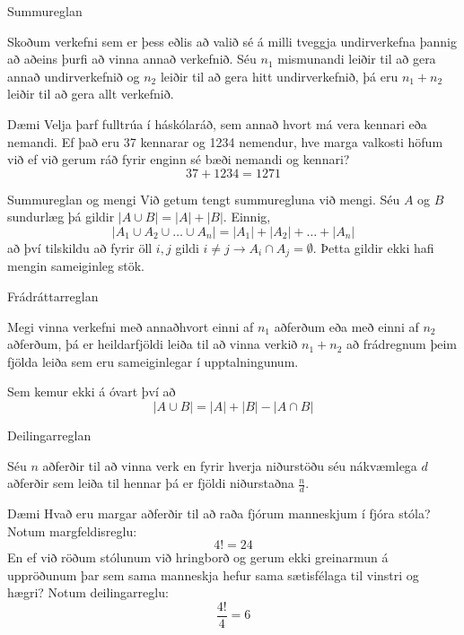 \documentclass{beamer}
\begin{document}
\begin{frame}{Summureglan}
\begin{tcolorbox}[title=Summureglan]
Skoðum verkefni sem er þess eðlis að valið sé á milli tveggja undirverkefna þannig að aðeins þurfi að vinna annað verkefnið. Séu $n_1$ mismunandi leiðir til að gera annað undirverkefnið og $n_2$ leiðir til að gera hitt undirverkefnið, þá eru $n_1 + n_2$ leiðir til að gera allt verkefnið.
\end{tcolorbox}
\end{frame}

\begin{frame}{Dæmi}
Velja þarf fulltrúa í háskólaráð, sem annað hvort má vera kennari eða nemandi. Ef það eru 37 kennarar og 1234 nemendur, hve marga valkosti höfum við ef við gerum ráð fyrir enginn sé bæði nemandi og kennari?
\pause
\[
 37+1234 = 1271
\]
\end{frame}

\begin{frame}{Summureglan og mengi}
Við getum tengt summuregluna við mengi. Séu $A$ og $B$ sundurlæg þá gildir $|A \cup B| = |A| + |B|$. Einnig,
\[
 |A_1 \cup A_2 \cup \ldots \cup A_n| = |A_1| + |A_2| + \ldots + |A_n|
\]
að því tilskildu að fyrir öll $i,j$ gildi $i \neq j \to A_i \cap A_j = \emptyset$. Þetta gildir ekki hafi mengin sameiginleg stök.
\end{frame}

\begin{frame}{Frádráttarreglan}
\begin{tcolorbox}[title=Frádráttarreglan]
Megi vinna verkefni með annaðhvort einni af $n_1$ aðferðum eða með einni af $n_2$ aðferðum, þá er heildarfjöldi leiða til að vinna verkið $n_1 + n_2$ að frádregnum þeim fjölda leiða sem eru sameiginlegar í upptalningunum.
\end{tcolorbox}
Sem kemur ekki á óvart því að
\[
 |A \cup B| = |A| + |B| - |A \cap B|
\]

\end{frame}

\begin{frame}{Deilingarreglan}
\begin{tcolorbox}[title=Deilingarreglan]
Séu $n$ aðferðir til að vinna verk en fyrir hverja niðurstöðu séu nákvæmlega $d$ aðferðir sem leiða til hennar þá er fjöldi niðurstaðna $\frac{n}{d}$.
\end{tcolorbox}
\end{frame}

\begin{frame}{Dæmi}
Hvað eru margar aðferðir til að raða fjórum manneskjum í fjóra stóla? \pause Notum margfeldisreglu:
\[4! = 24\]
En ef við röðum stólunum við hringborð og gerum ekki greinarmun á uppröðunum þar sem sama manneskja hefur sama sætisfélaga til vinstri og hægri? \pause Notum deilingarreglu:
\[\frac{4!}{4} = 6\]
\end{frame}
\end{document}
